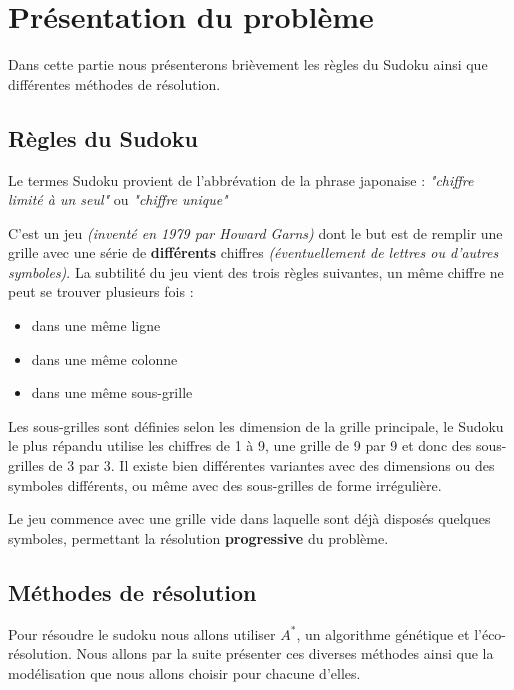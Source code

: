 \chapter{Présentation du problème}
  
Dans cette partie nous présenterons brièvement les règles du Sudoku ainsi que différentes méthodes de résolution.


\section{Règles du Sudoku}

Le termes Sudoku provient de l'abbrévation de la phrase japonaise : \textit{"chiffre limité à un seul"} ou \textit{"chiffre unique"}

C'est un jeu \textit{(inventé en 1979 par Howard Garns)} dont le but est de remplir une grille avec une série de \textbf{différents} chiffres \textit{(éventuellement de lettres ou d'autres symboles)}. La subtilité du jeu vient des trois règles suivantes, un même chiffre ne peut se trouver plusieurs fois :

\begin{itemize}

\item dans une même ligne
\item dans une même colonne
\item dans une même sous-grille

\end{itemize}

Les sous-grilles sont définies selon les dimension de la grille principale, le Sudoku le plus répandu utilise les chiffres de 1 à 9, une grille de 9 par 9 et donc des sous-grilles de 3 par 3. Il existe bien différentes variantes avec des dimensions ou des symboles différents, ou même avec des sous-grilles de forme irrégulière.

Le jeu commence avec une grille vide dans laquelle sont déjà disposés quelques symboles, permettant la résolution \textbf{progressive} du problème.


\section{Méthodes de résolution}

Pour résoudre le sudoku nous allons utiliser $A^*$, un algorithme génétique et l'éco-résolution. Nous allons par la suite présenter ces diverses méthodes ainsi que la modélisation que nous allons choisir pour chacune d'elles. 
